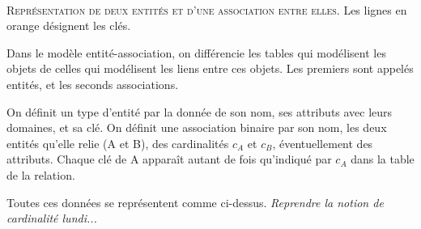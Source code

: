 \documentclass{scrartcl}
\begin{document}
		\begin{center}	
		 \\
		\textsc{Représentation de deux entités et d'une association entre elles}. Les lignes en orange désignent les clés.
		\end{center}

		Dans le modèle entité-association, on différencie les tables qui modélisent les objets de celles qui modélisent les liens entre ces objets.
		Les premiers sont appelés entités, et les seconds associations.

		On définit un type d'entité par la donnée de son nom, ses attributs avec leurs domaines, et sa clé.
		On définit une association binaire par son nom, les deux entités qu'elle relie (A et B), des cardinalités $c_A$ et $c_B$, éventuellement des attributs.
		Chaque clé de A apparaît autant de fois qu'indiqué par $c_A$ dans la table de la relation.

		Toutes ces données se représentent comme ci-dessus.
		\textsl{Reprendre la notion de cardinalité lundi...}
\end{document}
